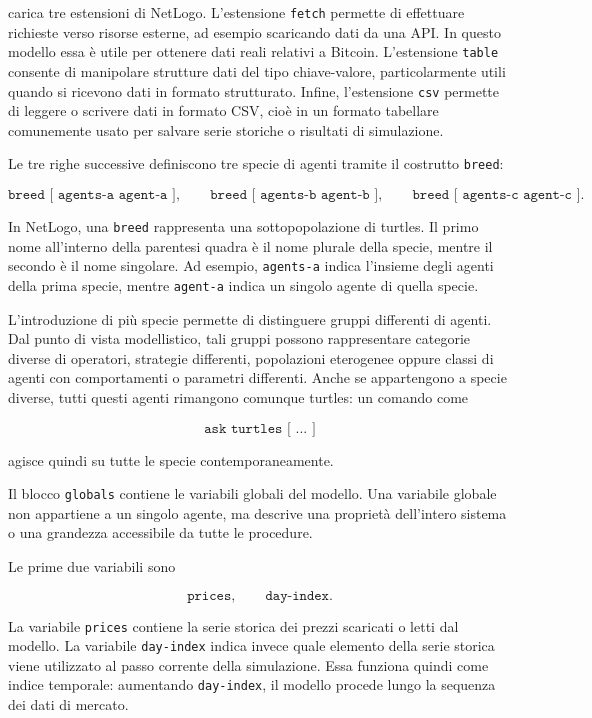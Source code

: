 carica tre estensioni di NetLogo. L'estensione \texttt{fetch} permette di
effettuare richieste verso risorse esterne, ad esempio scaricando dati da una
API. In questo modello essa è utile per ottenere dati reali relativi a Bitcoin.
L'estensione \texttt{table} consente di manipolare strutture dati del tipo
chiave-valore, particolarmente utili quando si ricevono dati in formato
strutturato. Infine, l'estensione \texttt{csv} permette di leggere o scrivere
dati in formato CSV, cioè in un formato tabellare comunemente usato per salvare
serie storiche o risultati di simulazione.

Le tre righe successive definiscono tre specie di agenti tramite il costrutto
\texttt{breed}:

\[
\texttt{breed [ agents-a agent-a ]},
\qquad
\texttt{breed [ agents-b agent-b ]},
\qquad
\texttt{breed [ agents-c agent-c ]}.
\]

In NetLogo, una \texttt{breed} rappresenta una sottopopolazione di turtles. Il
primo nome all'interno della parentesi quadra è il nome plurale della specie,
mentre il secondo è il nome singolare. Ad esempio, \texttt{agents-a} indica
l'insieme degli agenti della prima specie, mentre \texttt{agent-a} indica un
singolo agente di quella specie.

L'introduzione di più specie permette di distinguere gruppi differenti di agenti.
Dal punto di vista modellistico, tali gruppi possono rappresentare categorie
diverse di operatori, strategie differenti, popolazioni eterogenee oppure classi
di agenti con comportamenti o parametri differenti. Anche se appartengono a
specie diverse, tutti questi agenti rimangono comunque turtles: un comando come

\[
\texttt{ask turtles [ ... ]}
\]

agisce quindi su tutte le specie contemporaneamente.

Il blocco \texttt{globals} contiene le variabili globali del modello. Una
variabile globale non appartiene a un singolo agente, ma descrive una proprietà
dell'intero sistema o una grandezza accessibile da tutte le procedure.

Le prime due variabili sono

\[
\texttt{prices},
\qquad
\texttt{day-index}.
\]

La variabile \texttt{prices} contiene la serie storica dei prezzi scaricati o
letti dal modello. La variabile \texttt{day-index} indica invece quale elemento
della serie storica viene utilizzato al passo corrente della simulazione. Essa
funziona quindi come indice temporale: aumentando \texttt{day-index}, il modello
procede lungo la sequenza dei dati di mercato.

